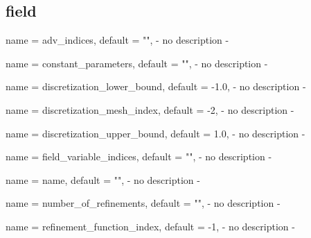 \subsection{field}

\begin{parameter}{
    name    = {adv_indices},
    default = {""},
}
- no description -
\end{parameter}

\begin{parameter}{
    name    = {constant_parameters},
    default = {""},
}
- no description -
\end{parameter}

\begin{parameter}{
    name    = {discretization_lower_bound},
    default = {-1.0},
}
- no description -
\end{parameter}

\begin{parameter}{
    name    = {discretization_mesh_index},
    default = {-2},
}
- no description -
\end{parameter}

\begin{parameter}{
    name    = {discretization_upper_bound},
    default = {1.0},
}
- no description -
\end{parameter}

\begin{parameter}{
    name    = {field_variable_indices},
    default = {""},
}
- no description -
\end{parameter}

\begin{parameter}{
    name    = {name},
    default = {""},
}
- no description -
\end{parameter}

\begin{parameter}{
    name    = {number_of_refinements},
    default = {""},
}
- no description -
\end{parameter}

\begin{parameter}{
    name    = {refinement_function_index},
    default = {-1},
}
- no description -
\end{parameter}

